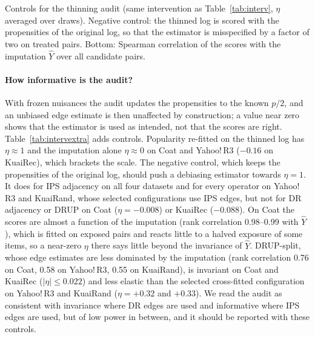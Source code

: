 \documentclass[preprint,review,12pt,authoryear]{elsarticle}
\theoremstyle{definition}
\begin{document}
\begin{table}[t]\centering\small
\caption{Controls for the thinning audit (same intervention as
Table~\ref{tab:interv}, $\eta$ averaged over draws). Negative control: the
thinned log is scored with the propensities of the original log, so that the
estimator is misspecified by a factor of two on treated pairs. Bottom: Spearman
correlation of the scores with the imputation $\hat Y$ over all candidate
pairs.}\label{tab:intervextra}
\begin{adjustbox}{max width=\textwidth}

\end{adjustbox}
\end{table}

\paragraph{How informative is the audit?} With frozen nuisances the audit updates the
propensities to the known $p/2$, and an unbiased edge estimate is then unaffected by
construction; a value near zero shows that the estimator is used as intended, not that the
scores are right. Table~\ref{tab:intervextra} adds controls. Popularity re-fitted on the
thinned log has $\eta\approx1$ and the imputation alone $\eta\approx0$ on Coat and
Yahoo!\,R3 ($-0.16$ on KuaiRec), which brackets the scale. The negative control, which
keeps the propensities of the original log, should push a debiasing estimator towards
$\eta=1$. It does for IPS adjacency on all four datasets and for every operator on
Yahoo!\,R3 and KuaiRand, whose selected configurations use IPS edges, but not for DR
adjacency or DRUP on Coat ($\eta=-0.008$) or KuaiRec ($-0.088$). On Coat the scores are
almost a function of the imputation (rank correlation 0.98--0.99 with $\hat Y$), which is
fitted on exposed pairs and reacts little to a halved exposure of some items, so a
near-zero $\eta$ there says little beyond the invariance of $\hat Y$. DRUP-split, whose
edge estimates are less dominated by the imputation (rank correlation 0.76 on Coat, 0.58
on Yahoo!\,R3, 0.55 on KuaiRand), is invariant on Coat and KuaiRec ($|\eta|\le0.022$) and
less elastic than the selected cross-fitted configuration on Yahoo!\,R3 and KuaiRand
($\eta=+0.32$ and $+0.33$). We read the audit as consistent with invariance where DR edges
are used and informative where IPS edges are used, but of low power in between, and it
should be reported with these controls.


\end{document}
